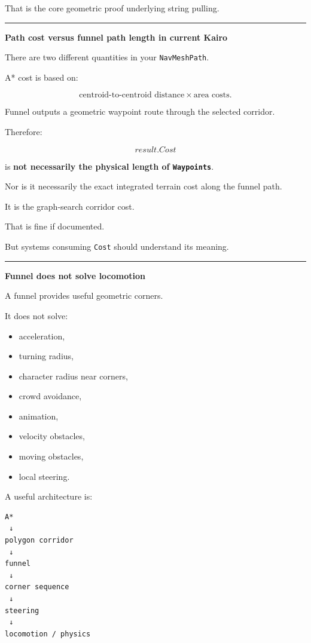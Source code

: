 That is the core geometric proof underlying string pulling.

\begin{center}\rule{0.5\linewidth}{0.5pt}\end{center}

\textbf{Path cost versus funnel path length in current Kairo}

There are two different quantities in your \texttt{NavMeshPath}.

A* cost is based on:

\[
\text{centroid-to-centroid distance}
\times
\text{area costs}.
\]

Funnel outputs a geometric waypoint route through the selected corridor.

Therefore:

\[
result.Cost
\]

is \textbf{not necessarily the physical length of \texttt{Waypoints}}.

Nor is it necessarily the exact integrated terrain cost along the funnel path.

It is the graph-search corridor cost.

That is fine if documented.

But systems consuming \texttt{Cost} should understand its meaning.

\begin{center}\rule{0.5\linewidth}{0.5pt}\end{center}

\textbf{Funnel does not solve locomotion}

A funnel provides useful geometric corners.

It does not solve:

\begin{itemize}
\tightlist
\item
  acceleration,
\item
  turning radius,
\item
  character radius near corners,
\item
  crowd avoidance,
\item
  animation,
\item
  velocity obstacles,
\item
  moving obstacles,
\item
  local steering.
\end{itemize}

A useful architecture is:

\begin{verbatim}
A*
 ↓
polygon corridor
 ↓
funnel
 ↓
corner sequence
 ↓
steering
 ↓
locomotion / physics
\end{verbatim}

